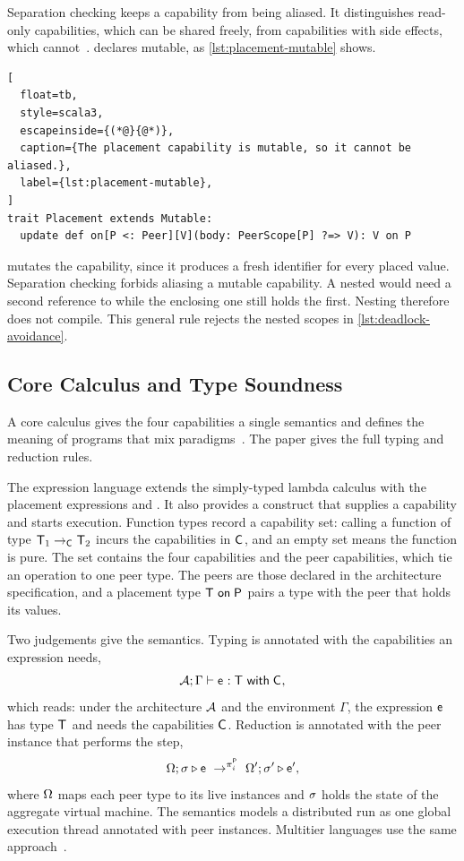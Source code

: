 Separation checking keeps a capability from being aliased.
%
It distinguishes read-only capabilities, which can be shared freely, from capabilities with side effects, which cannot~\cite{DBLP:journals/pacmpl/XuBO24}.
%
\camil declares  mutable, as \cref{lst:placement-mutable} shows.

\begin{lstlisting}[
  float=tb,
  style=scala3,
  escapeinside={(*@}{@*)},
  caption={The placement capability is mutable, so it cannot be aliased.},
  label={lst:placement-mutable},
]
trait Placement extends Mutable:
  update def on[P <: Peer][V](body: PeerScope[P] ?=> V): V on P
\end{lstlisting}

 mutates the capability, since it produces a fresh identifier for every placed value.
%
Separation checking forbids aliasing a mutable capability.
A nested  would need a second reference to  while the enclosing one still holds the first.
%
Nesting therefore does not compile.
%
This general rule rejects the nested scopes in \cref{lst:deadlock-avoidance}.

\subsection{Core Calculus and Type Soundness}
\label{subsec:camil-formalization}

A core calculus gives the four capabilities a single semantics and defines the meaning of programs that mix paradigms~\cite{Farabegoli:2026:CaMiL}.
%
The paper gives the full typing and reduction rules.

The expression language extends the simply-typed lambda calculus with the placement expressions  and .
It also provides a  construct that supplies a capability and starts execution.
%
Function types record a capability set:
calling a function of type $\mptype[1] \rightarrow_{\capset} \mptype[2]$ incurs the capabilities in $\capset$,
and an empty set means the function is pure.
%
The set contains the four capabilities and the peer capabilities, which tie an operation to one peer type.
%
The peers are those declared in the architecture specification,
and a placement type $\ton{\mptype}{\pfam}$ pairs a type with the peer that holds its values.

Two judgements give the semantics.
%
Typing is annotated with the capabilities an expression needs,
\[
    \typing{\Gamma}{\mpexpr}{\mptype}{\capset},
\]
which reads: under the architecture $\arch$ and the environment $\Gamma$, the expression $\mpexpr$ has type $\mptype$ and needs the capabilities $\capset$.
%
Reduction is annotated with the peer instance that performs the step,
\[
    \redn{\peerconf;\vmstate}{\mpexpr}{\peerconf';\vmstate'}{\mpexpr'}{\peerinst[i]{\pfam}},
\]
where $\peerconf$ maps each peer type to its live instances and $\vmstate$ holds the state of the aggregate virtual machine.
%
The semantics models a distributed run as one global execution thread annotated with peer instances.
Multitier languages use the same approach~\cite{DBLP:journals/pacmpl/WeisenburgerKS18,Zakhour:2023:TypeSafe}.

